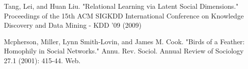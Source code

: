 \documentclass[11pt,letterpaper]{article}
\begin{document}
\begin{thebibliography}{99} 
	
Tang, Lei, and Huan Liu. "Relational Learning via Latent Social Dimensions." Proceedings of the 15th ACM SIGKDD International Conference on Knowledge Discovery and Data Mining - KDD '09 (2009)

 Mcpherson, Miller, Lynn Smith-Lovin, and James M. Cook. "Birds of a Feather: Homophily in Social Networks." Annu. Rev. Sociol. Annual Review of Sociology 27.1 (2001): 415-44. Web.


\end{thebibliography}
\end{document}
